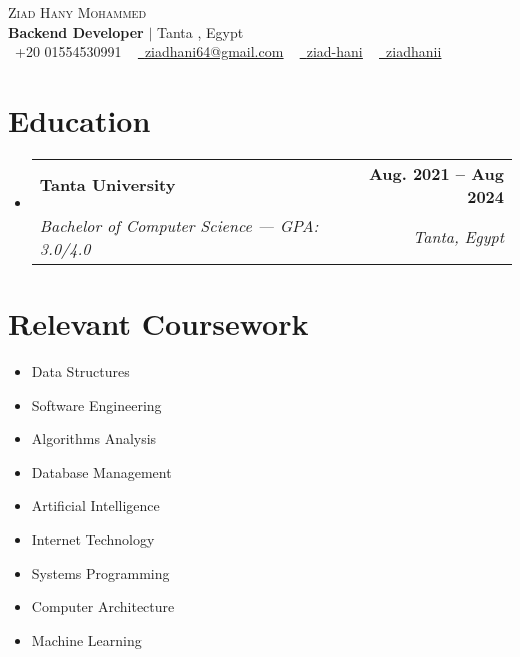 \documentclass[letterpaper,11pt]{article}
\makeatletter
\newcommand{\resumeSubheading}[4]{
  \vspace{-2pt}\item
    \begin{tabular*}{1.0\textwidth}[t]{l@{\extracolsep{\fill}}r}
      \textbf{#1} & \textbf{\small #2} \\
      \textit{\small#3} & \textit{\small #4} \\
    \end{tabular*}\vspace{-7pt}
}
\newcommand{\resumeSubHeadingListStart}{\begin{itemize}[leftmargin=0.0in, label={}]}
\newcommand{\resumeSubHeadingListEnd}{\end{itemize}}
\makeatother
\begin{document}

\begin{center}
    {\Huge \scshape Ziad Hany Mohammed} \\ 
       \vspace{5pt}
    {\Large \textbf{Backend Developer} \hspace{15pt} $|$ \hspace{15pt} Tanta , Egypt} \\ 
    \vspace{5pt}
    \small 
    \raisebox{-0.1\height}\faPhone\ +20 01554530991 ~ 
    \href{mailto:ziadhani64@gmail.com}{\raisebox{-0.2\height}\faEnvelope\ \underline{ziadhani64@gmail.com}} ~ 
    \href{https://www.linkedin.com/in/ziad-hani/}{\raisebox{-0.2\height}\faLinkedin\ \underline{ziad-hani}} ~ 
    \href{https://github.com/ziadhanii}{\raisebox{-0.2\height}\faGithub\ \underline{ziadhanii}}
    \vspace{-8pt}
\end{center}

\section{Education}
  \resumeSubHeadingListStart
    \resumeSubheading
      {Tanta University}{Aug. 2021 -- Aug 2024}
      {Bachelor of Computer Science — GPA: 3.0/4.0}{Tanta, Egypt}
  \resumeSubHeadingListEnd

\section{Relevant Coursework}
    \begin{multicols}{3}
        \begin{itemize}[itemsep=-5pt, parsep=3pt]
            \item \small Data Structures
            \item Software Engineering
            \item Algorithms Analysis
            \item Database Management
            \item Artificial Intelligence
            \item Internet Technology
            \item Systems Programming
            \item Computer Architecture
            \item Machine Learning
        \end{itemize}
    \end{multicols}
    \vspace*{2.0\multicolsep}
    
\end{document}
